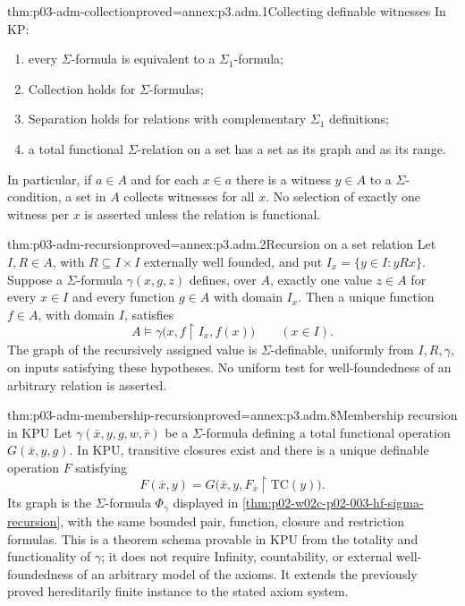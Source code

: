 \begin{hblemma}{thm:p03-adm-collection}{proved=annex:p3.adm.1}{Collecting definable witnesses}
In \(\mathrm{KP}\):
\begin{enumerate}
\item every \(\Sigma\)-formula is equivalent to a \(\Sigma_1\)-formula;
\item Collection holds for \(\Sigma\)-formulas;
\item Separation holds for relations with complementary
      \(\Sigma_1\) definitions;
\item a total functional \(\Sigma\)-relation on a set has a set as its
      graph and as its range.
\end{enumerate}
In particular, if \(a\in A\) and for each \(x\in a\) there is a witness
\(y\in A\) to a \(\Sigma\)-condition, a set in \(A\) collects witnesses
for all \(x\). No selection of exactly one witness per \(x\) is asserted
unless the relation is functional.
\end{hblemma}

\begin{hblemma}{thm:p03-adm-recursion}{proved=annex:p3.adm.2}{Recursion on a set relation}
Let \(I,R\in A\), with \(R\subseteq I\times I\) externally well founded,
and put \(I_x=\{y\in I:yRx\}\). Suppose a \(\Sigma\)-formula
\(\gamma(x,g,z)\) defines, over \(A\), exactly one value \(z\in A\)
for every \(x\in I\) and every function \(g\in A\) with domain \(I_x\).
Then a unique function \(f\in A\), with domain \(I\), satisfies
\[
 A\models\gamma\bigl(x,f\restriction I_x,f(x)\bigr)
 \qquad(x\in I).
\]
The graph of the recursively assigned value is \(\Sigma\)-definable,
uniformly from \(I,R,\gamma\), on inputs satisfying these hypotheses.
No uniform test for well-foundedness of an arbitrary relation is asserted.
\end{hblemma}

\begin{hbtheorem}{thm:p03-adm-membership-recursion}{proved=annex:p3.adm.8}{Membership recursion in KPU}
Let \(\gamma(\bar x,y,g,w,\bar r)\) be a \(\Sigma\)-formula defining a
total functional operation \(G(\bar x,y,g)\). In \(\mathrm{KPU}\),
transitive closures exist and there is a unique definable operation
\(F\) satisfying
\[
 F(\bar x,y)=G\bigl(\bar x,y,
                  F_{\bar x}\restriction\mathrm{TC}(y)\bigr).
\]
Its graph is the \(\Sigma\)-formula \(\Phi_\gamma\) displayed in
\cref{thm:p02-w02c-p02-003-hf-sigma-recursion}, with the same bounded
pair, function, closure and restriction formulas. This is a theorem
schema provable in \(\mathrm{KPU}\) from the totality and functionality
of \(\gamma\); it does not require Infinity, countability, or external
well-foundedness of an arbitrary model of the axioms. It extends the
previously proved hereditarily finite instance to the stated axiom system.
\end{hbtheorem}

